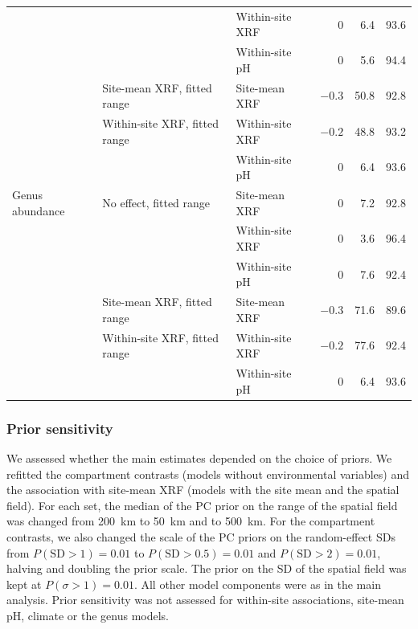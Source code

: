 \documentclass[11pt]{article}
\begin{document}
\begin{table}[ht]
{\begin{tabular}{lllrrr}
               &                               & Within-site XRF & 0      & 6.4  & 93.6 \\
               &                               & Within-site pH  & 0      & 5.6  & 94.4 \\
               & Site-mean XRF, fitted range   & Site-mean XRF   & $-0.3$ & 50.8 & 92.8 \\
               & Within-site XRF, fitted range & Within-site XRF & $-0.2$ & 48.8 & 93.2 \\
               &                               & Within-site pH  & 0      & 6.4  & 93.6 \\
\addlinespace
Genus abundance & No effect, fitted range       & Site-mean XRF   & 0      & 7.2  & 92.8 \\
                &                               & Within-site XRF & 0      & 3.6  & 96.4 \\
                &                               & Within-site pH  & 0      & 7.6  & 92.4 \\
                & Site-mean XRF, fitted range   & Site-mean XRF   & $-0.3$ & 71.6 & 89.6 \\
                & Within-site XRF, fitted range & Within-site XRF & $-0.2$ & 77.6 & 92.4 \\
                &                               & Within-site pH  & 0      & 6.4  & 93.6 \\
\bottomrule
\end{tabular}
}
\end{table}

\subsubsection{Prior sensitivity}\label{priors}
We assessed whether the main estimates depended on the choice of priors. We refitted the compartment contrasts (models without environmental variables) and the association with site-mean XRF (models with the site mean and the spatial field). For each set, the median of the PC prior on the range of the spatial field was changed from 200~km to 50~km and to 500~km. For the compartment contrasts, we also changed the scale of the PC priors on the random-effect SDs from $P(\mathrm{SD} > 1) = 0.01$ to $P(\mathrm{SD} > 0.5) = 0.01$ and $P(\mathrm{SD} > 2) = 0.01$, halving and doubling the prior scale. The prior on the SD of the spatial field was kept at $P(\sigma > 1) = 0.01$. All other model components were as in the main analysis. Prior sensitivity was not assessed for within-site associations, site-mean pH, climate or the genus models.
\end{document}
